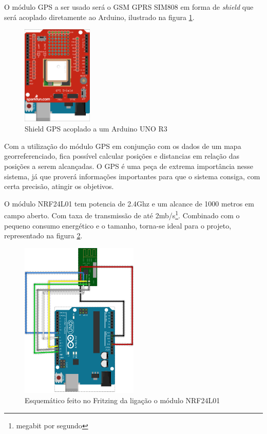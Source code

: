 O módulo GPS a ser usado será o GSM GPRS SIM808 em forma de\textit{ shield} que será acoplado diretamente ao Arduino, ilustrado na figura \ref{fig:gps:vaa}.
\begin{figure}[H]
    \centering
    \includegraphics[width=0.3\textwidth]{figuras/ARDUINOGPS.png}
    \caption{Shield GPS acoplado a um Arduino UNO R3}
    \label{fig:gps:vaa}
\end{figure}

Com a utilização do módulo GPS em conjunção com os dados de um mapa georreferenciado, fica possível calcular posições e distancias em relação das posições a serem alcançadas. O GPS é uma peça de extrema importância nesse sistema, já que proverá informações importantes para que o sistema consiga, com certa precisão, atingir os objetivos.

O módulo NRF24L01 tem potencia de 2.4Ghz e um alcance de 1000 metros em campo aberto. Com taxa de transmissão de até 2mb/s\footnote{megabit por segundo}. Combinado com o pequeno consumo energético e o tamanho, torna-se ideal para o projeto, representado na figura \ref{fig:fritz:radio}.
\begin{figure}[H]
    \centering
    \includegraphics[width=0.5\textwidth]{figuras/RADIO.png}
    \caption{Esquemático feito no Fritzing da ligação o módulo NRF24L01}
    \label{fig:fritz:radio}
\end{figure}

